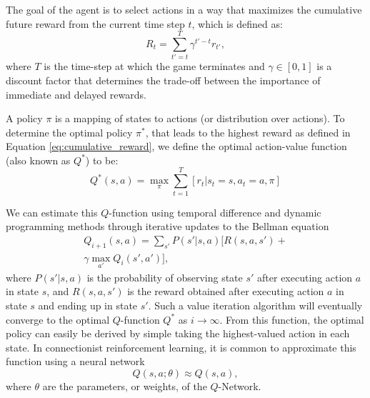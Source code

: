 The goal of the agent is to select actions in a way that maximizes the cumulative future reward from the current time step $t$, which is defined as:
\begin{equation}\label{eq:cumulative_reward}
	R_t = \sum_{t'=t}^{T} \gamma^{t'-t} r_{t'},
\end{equation}
where $T$ is the time-step at which the game terminates and $\gamma \in [0,1]$ is a discount factor that determines the trade-off between the importance of immediate and delayed rewards. 

A policy $\pi$ is a mapping of states to actions (or distribution over actions). To determine the optimal policy $\pi^*$, that leads to the highest reward as defined in Equation \eqref{eq:cumulative_reward}, we define the optimal action-value function (also known as $Q^*$) to be:
\begin{equation}\label{qfunction}
	Q^*(s, a) = \max_\pi \sum_{t=1}^T [r_t \vert s_t=s, a_t=a, \pi]
\end{equation}

We can estimate this $Q$-function using temporal difference and dynamic programming methods through iterative updates to the Bellman equation
\begin{equation}
	\begin{array}{c}
		Q_{i+1}(s, a) = \sum_{s'} P(s' \vert s, a) [R(s,a,s') + \\
		\gamma \max_{a'} Q_i(s', a')],
	\end{array}
\end{equation}
where $P(s'\vert s,a)$ is the probability of observing state $s'$ after executing action $a$ in state $s$, and $R(s,a,s')$ is the reward obtained after executing action $a$ in state $s$ and ending up in state $s'$.
Such a value iteration algorithm will eventually converge to the optimal $Q$-function $Q^*$ as $i \rightarrow \infty$. From this function, the optimal policy can easily be derived by simple taking the highest-valued action in each state. In connectionist reinforcement learning, it is common to approximate this function using a neural network
\begin{equation}
	Q(s, a; \theta) \approx Q(s, a),
\end{equation}
where $\theta$ are the parameters, or weights, of the $Q$-Network.